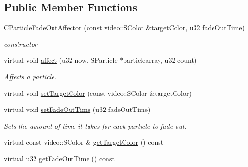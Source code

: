 \subsection*{Public Member Functions}
\begin{DoxyCompactItemize}
\item 
\hypertarget{classirr_1_1scene_1_1_c_particle_fade_out_affector_a85559c7ad06737eaaed94e316c3f2aa9}{\hyperlink{classirr_1_1scene_1_1_c_particle_fade_out_affector_a85559c7ad06737eaaed94e316c3f2aa9}{C\-Particle\-Fade\-Out\-Affector} (const video\-::\-S\-Color \&target\-Color, u32 fade\-Out\-Time)}\label{classirr_1_1scene_1_1_c_particle_fade_out_affector_a85559c7ad06737eaaed94e316c3f2aa9}

\begin{DoxyCompactList}\small\item\em constructor \end{DoxyCompactList}\item 
virtual void \hyperlink{classirr_1_1scene_1_1_c_particle_fade_out_affector_a39918f71372261ce9de1a1a4eaf26838}{affect} (u32 now, S\-Particle $\ast$particlearray, u32 count)
\begin{DoxyCompactList}\small\item\em Affects a particle. \end{DoxyCompactList}\item 
virtual void \hyperlink{classirr_1_1scene_1_1_c_particle_fade_out_affector_a0cb420ab3245d3c922cd5e71b0330581}{set\-Target\-Color} (const video\-::\-S\-Color \&target\-Color)
\item 
\hypertarget{classirr_1_1scene_1_1_c_particle_fade_out_affector_a89c73d3a4a6c4f69e7884102067c6bff}{virtual void \hyperlink{classirr_1_1scene_1_1_c_particle_fade_out_affector_a89c73d3a4a6c4f69e7884102067c6bff}{set\-Fade\-Out\-Time} (u32 fade\-Out\-Time)}\label{classirr_1_1scene_1_1_c_particle_fade_out_affector_a89c73d3a4a6c4f69e7884102067c6bff}

\begin{DoxyCompactList}\small\item\em Sets the amount of time it takes for each particle to fade out. \end{DoxyCompactList}\item 
virtual const video\-::\-S\-Color \& \hyperlink{classirr_1_1scene_1_1_c_particle_fade_out_affector_a0a046f424e632296dd3f555df988b1a1}{get\-Target\-Color} () const 
\item 
\hypertarget{classirr_1_1scene_1_1_c_particle_fade_out_affector_ab61a152dcc71a4e012c6d5465928e3b5}{virtual u32 \hyperlink{classirr_1_1scene_1_1_c_particle_fade_out_affector_ab61a152dcc71a4e012c6d5465928e3b5}{get\-Fade\-Out\-Time} () const }\label{classirr_1_1scene_1_1_c_particle_fade_out_affector_ab61a152dcc71a4e012c6d5465928e3b5}


\end{DoxyCompactItemize}
